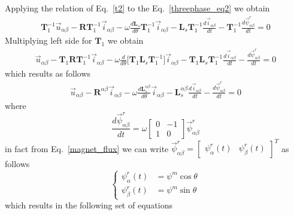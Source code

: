 \documentclass[12pt,a4paper]{scrartcl}
\begin{document}
\begin{onehalfspace}
Applying the relation of Eq.~\eqref{t2} to the Eq.~\eqref{threephase_eq2} we obtain
\begin{equation*}
	\begin{aligned}
		\mathbf{T}_1^{-1}\vec{u}_{\alpha\beta}-\mathbf{R}\mathbf{T}_1^{-1}\vec{i}_{\alpha\beta}-\omega\frac{d\mathbf{L}_s}{d\theta}\mathbf{T}_1^{-1}\vec{i}_{\alpha\beta}-\mathbf{L}_s \mathbf{T}_1^{-1}\frac{d\vec{i}_{\alpha\beta}}{dt}-\mathbf{T}_1^{-1}\frac{d\vec{\psi}^r_{\alpha\beta}}{dt} = 0
	\end{aligned} 
\end{equation*}
Multiplying left side for $\mathbf{T}_1$ we obtain
\begin{equation*}
	\begin{aligned}
		\vec{u}_{\alpha\beta}-\mathbf{T}_1\mathbf{R}\mathbf{T}_1^{-1}\vec{i}_{\alpha\beta}-\omega\frac{d}{d\theta}\Big[\mathbf{T}_1\mathbf{L}_s\mathbf{T}_1^{-1}\Big]\vec{i}_{\alpha\beta}-\mathbf{T}_1\mathbf{L}_s\mathbf{T}_1^{-1}\frac{d\vec{i}_{\alpha\beta}}{dt}-\frac{d\vec{\psi}^r_{\alpha\beta}}{dt} = 0
	\end{aligned} 
\end{equation*}
which results as follows
\begin{equation}
	\begin{aligned}
		\vec{u}_{\alpha\beta}-\mathbf{R}^{\alpha\beta}\vec{i}_{\alpha\beta}-\omega\frac{d\mathbf{L}_s^{\alpha\beta}}{d\theta}\vec{i}_{\alpha\beta}-\mathbf{L}_s^{\alpha\beta}\frac{d\vec{i}_{\alpha\beta}}{dt}-\frac{d\vec{\psi}^r_{\alpha\beta}}{dt} = 0
	\end{aligned} 
\end{equation}
where $$\frac{d\vec{\psi}^r_{\alpha\beta}}{dt} = \omega \begin{bmatrix} 0 & -1 \\ 1 & 0\end{bmatrix} \vec{\psi}^r_{\alpha\beta}$$
in fact from Eq.~\eqref{magnet_flux} we can write $\vec{\psi}^r_{\alpha\beta}=\begin{bmatrix} {\psi}^r_{\alpha}(t) &  {\psi}^r_{\beta}(t) \end{bmatrix}^T$ as follows
\begin{equation}\label{magnet_flux_ab}
	\left\lbrace \begin{aligned}
		\psi_\alpha^r(t) &= \psi^m\cos\theta \\[6pt]
		\psi_\beta^r(t) &= \psi^m\sin\theta
	\end{aligned} \right. 
\end{equation}
which results in the following set of equations

\end{onehalfspace}
\end{document}
